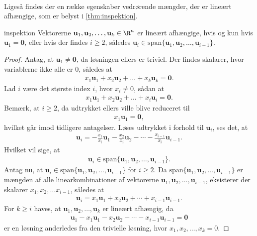 \\
%
%
Ligeså findes der en række egenskaber vedrørende mængder, der er lineært afhængige, som er belyst i \ref{thm:inspektion}.
%
%
\begin{thm}{}{inspektion}
%
Vektorerne $\mathbf{u}_1,\mathbf{u}_2, \ldots ,\mathbf{u}_k \in\R^n$ er lineært afhængige, 
hvis og kun hvis $\mathbf{u}_1=\mathbf{0}$, eller hvis der findes $i \geq 2$, således $\mathbf{u}_i \in \text{span} \{ \mathbf{u}_1,\mathbf{u}_2, \ldots ,\mathbf{u}_{i-1} \}$.
%
\end{thm}
%
%
\begin{proof}
% 
Antag, at $\mathbf{u}_1 \neq \mathbf{0}$, da løsningen ellers er triviel. 
Der findes skalarer, hvor variablerne ikke alle er $0$, således at
% 
\begin{align*}
x_1 \mathbf{u}_1 + x_2 \mathbf{u}_2 + \ldots + x_k \mathbf{u}_k = \mathbf{0}.
\end{align*}
%
Lad $i$ være det største index $i$, hvor $x_i \neq 0$, sådan at 
\begin{align*}
x_1 \mathbf{u}_1 + x_2 \mathbf{u}_2 + \ldots + x_i \mathbf{u}_i = \mathbf{0}.
\end{align*}
Bemærk, at $i\geq2$, da udtrykket ellers ville blive reduceret til
%
\begin{align*}
x_1\textbf{u}_1=\mathbf{0},
\end{align*}
%
hvilket går imod tidligere antagelser.
Løses udtrykket i forhold til $\mathbf{u}_i$, ses det, at
\begin{align*}
\mathbf{u}_i = - \frac{x_1}{x_i} \mathbf{u}_1 - \frac{x_2}{x_i} \mathbf{u}_2 - \cdots - \frac{x_{i-1}}{x_i} \mathbf{u}_{i-1}.
\end{align*}
Hvilket vil sige, at 
\begin{align*}
\mathbf{u}_i \in \text{span}\{ \mathbf{u}_1,\mathbf{u}_2, \ldots ,\mathbf{u}_{i-1} \}.
\end{align*}
%
Antag nu, at $\mathbf{u}_i \in \text{span}\{ \mathbf{u}_1,\mathbf{u}_2, \ldots ,\mathbf{u}_{i-1} \}$ for $i \geq 2$.
Da $\text{span}\{ \mathbf{u}_1,\mathbf{u}_2, \ldots ,\mathbf{u}_{i-1} \}$ er mængden af alle linearkombinationer af vektorerne $\mathbf{u}_1,\mathbf{u}_2, \ldots ,\mathbf{u}_{i-1}$, eksisterer der skalarer $x_1, x_2, \ldots x_{i-1}$, således at
%
\begin{align*}
\textbf{u}_i=x_1\mathbf{u}_1 + x_2 \mathbf{u}_2 + \cdots + x_{i-1}\mathbf{u}_{i-1}.
\end{align*}
%
For $k \geq i$ haves, at $\mathbf{u}_1,\mathbf{u}_2, \ldots ,\mathbf{u}_k$ er lineært afhængig, da 
\begin{align*}
\textbf{u}_1 -x_1\textbf{u}_1 - x_2\textbf{u}_2 - \cdots - x_{i-1}\textbf{u}_{i-1} = \textbf{0}
\end{align*} 
er en løsning anderledes fra den trivielle løsning, hvor $x_1, x_2,\ldots,x_k=0$.
%
\end{proof}
